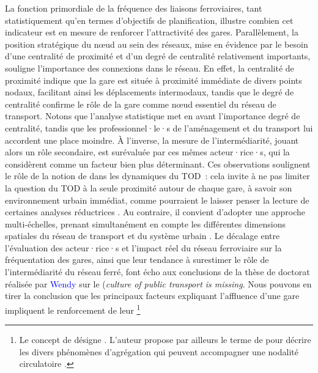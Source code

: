 \begin{refsegment}
La fonction primordiale de la fréquence des liaisons ferroviaires, tant statistiquement qu'en termes d'objectifs de planification, illustre combien cet indicateur est en mesure de renforcer l'attractivité des gares. Parallèlement, la position stratégique du nœud au sein des réseaux, mise en évidence par le besoin d'une centralité de proximité et d'un degré de centralité relativement importants, souligne l'importance des connexions dans le réseau. En effet, la centralité de proximité indique que la gare est située à proximité immédiate de divers points nodaux, facilitant ainsi les déplacements intermodaux, tandis que le degré de centralité confirme le rôle de la gare comme nœud essentiel du réseau de transport. Notons que l'analyse statistique met en avant l'importance degré de centralité, tandis que les professionnel·le·s de l'aménagement et du transport lui accordent une place moindre. À l'inverse, la mesure de l'intermédiarité, jouant alors un rôle secondaire, est surévaluée par ces mêmes acteur·rice·s, qui la considèrent comme un facteur bien plus déterminant. Ces observations soulignent le rôle de la notion de  dans les dynamiques du \acrshort{TOD}~: cela invite à ne pas limiter la question du \acrshort{TOD} à la seule proximité autour de chaque gare, à savoir son environnement urbain immédiat, comme pourraient le laisser penser la lecture de certaines analyses réductrices \textcolor{blue}{\autocite[10]{cerema_articuler_2015}}. Au contraire, il convient d'adopter une approche multi-échelles, prenant simultanément en compte les différentes dimensions spatiales du réseau de transport et du système urbain \textcolor{blue}{\autocite[11]{cervero_transit_1998}}. Le décalage entre l’évaluation des acteur·rice·s et l’impact réel du réseau ferroviaire sur la fréquentation des gares, ainsi que leur tendance à surestimer le rôle de l’intermédiarité du réseau ferré, font écho aux conclusions de la thèse de doctorat réalisée par \textcolor{blue}{Wendy} \textcolor{blue}{\autocite[79]{tan_pursuing_2013}} sur le  (\textsl{culture of public transport is missing}. Nous pouvons en tirer la conclusion que les principaux facteurs expliquant l'affluence d'une gare impliquent le renforcement de leur \footnote{
    Le concept de  désigne  \textcolor{blue}{\autocite[5]{bavoux_nodalite_2005}}. L'auteur propose par ailleurs le terme de  pour décrire les divers phénomènes d'agrégation qui peuvent accompagner une nodalité circulatoire \textcolor{blue}{\autocite[13]{bavoux_nodalite_2005}}.
}
\end{refsegment}
